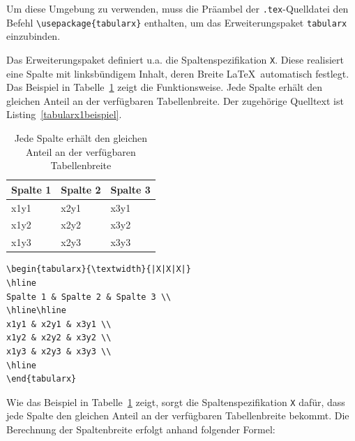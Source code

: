 \documentclass[a4paper,10pt,twoside]{scrbook}
\begin{document}
{

Um diese Umgebung zu verwenden, muss die Präambel der \verb!.tex!-Quelldatei den Befehl 
\verb!\usepackage{tabularx}! enthalten, um das Erweiterungspaket \verb!tabularx! einzubinden.

Das Erweiterungspaket definiert u.a. die Spaltenspezifikation \verb!X!. Diese realisiert eine Spalte mit linksbündigem Inhalt, deren Breite \LaTeX\ automatisch festlegt. Das Beispiel in Tabelle~\ref{Tabelle_tabularx1} zeigt die Funktionsweise. Jede Spalte erhält den gleichen Anteil an der verfügbaren Tabellenbreite. Der zugehörige Quelltext ist Listing~\ref{tabularx1beispiel}. 


\begin{table}[h!tb]
\centering
\caption{Jede Spalte erhält den gleichen Anteil an der verfügbaren Tabellenbreite}
\label{Tabelle_tabularx1}
\begin{tabularx}{\textwidth}{|X|X|X|}
\hline
Spalte 1 & Spalte 2 & Spalte 3 \\
\hline\hline
x1y1 & x2y1 & x3y1 \\
x1y2 & x2y2 & x3y2 \\
x1y3 & x2y3 & x3y3 \\
\hline
\end{tabularx}
\end{table}



\begin{lstlisting}[caption={Die Umgebung \texttt{tabularx} ermöglicht Tabellen mit definierbarer Breite und automatischer Spaltenbreite},label=tabularx1beispiel, style=customlatex]
\begin{tabularx}{\textwidth}{|X|X|X|}
\hline
Spalte 1 & Spalte 2 & Spalte 3 \\
\hline\hline
x1y1 & x2y1 & x3y1 \\
x1y2 & x2y2 & x3y2 \\
x1y3 & x2y3 & x3y3 \\
\hline
\end{tabularx}
\end{lstlisting}


Wie das Beispiel in Tabelle~\ref{Tabelle_tabularx1} zeigt, 
sorgt die Spaltenspezifikation \verb!X! 
dafür, dass jede Spalte den gleichen Anteil an der verfügbaren
Tabellenbreite bekommt. Die Berechnung der Spaltenbreite erfolgt anhand folgender 
Formel:

}
\end{document}
